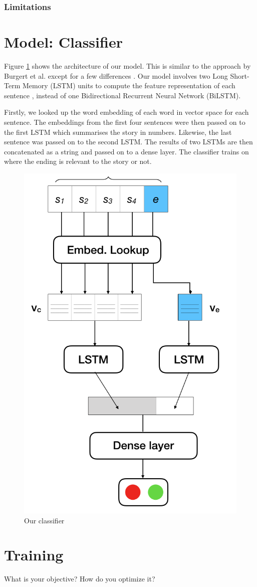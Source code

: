 \documentclass{article}
\begin{document}
\subsubsection{Limitations}


\section{Model: Classifier}

Figure \ref{Figure:model} shows the architecture of our model. This is similar to the approach by Burgert et al. except for a few differences \cite{top4}. Our model involves two Long Short-Term Memory (LSTM) units to compute the feature representation of each sentence \citep{lstm}, instead of one Bidirectional Recurrent Neural Network (BiLSTM).

Firstly, we looked up the word embedding of each word in vector space for each sentence. The embeddings from the first four sentences were then passed on to the first LSTM which summarises the story in numbers. Likewise, the last sentence was passed on to the second LSTM. The results of two LSTMs are then concatenated as a string and passed on to a dense layer. The classifier trains on where the ending is relevant to the story or not.

\begin{figure}
  \centering
  \includegraphics[width=0.5 \linewidth]{fig/ourmodel.PNG}
  \caption{Our classifier}
  \label{Figure:model}
\end{figure}

\section{Training}
What is your objective? How do you optimize it?
\end{document}

